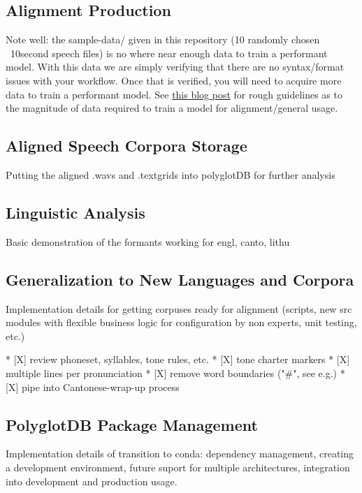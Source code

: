 \documentclass[11pt]{article}
\begin{document}
\subsection{Alignment Production}

Note well: the sample-data/ given in this repository (10 randomly chosen ~10second speech files) is no where near enough data to train a performant model. With this data we are simply verifying that there are no syntax/format issues with your workflow. Once that is verified, you will need to acquire more data to train a performant model. See \href{https://memcauliffe.com/how-much-data-do-you-need-for-a-good-mfa-alignment.html}{this blog post} for rough guidelines as to the magnitude of data required to train a model for alignment/general usage.


\subsection{Aligned Speech Corpora Storage}

Putting the aligned .wavs and .textgrids into polyglotDB for further analysis

\subsection{Linguistic Analysis}

Basic demonstration of the formants working for engl, canto, lithu

\subsection{Generalization to New Languages and Corpora}

Implementation details for getting corpuses ready for alignment (scripts, new src modules with flexible business logic for configuration by non experts, unit testing, etc.)

    * [X] review phoneset, syllables, tone rules, etc.
    * [X] tone charter markers
    * [X] multiple lines per pronunciation
    * [X] remove word boundaries ("\#", see e.g.)
    * [X] pipe into Cantonese-wrap-up process

\subsection{PolyglotDB Package Management}

Implementation details of transition to conda: dependency management, creating a development environment, future suport for multiple architectures, integration into development and production usage.
\end{document}
